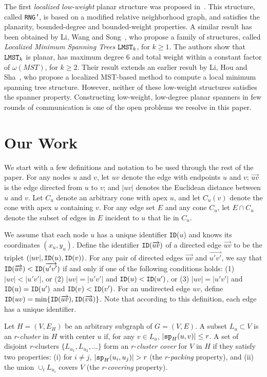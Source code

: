 \documentclass{llncs}
\newcommand{\id}{{\tt ID}}
\newcommand{\ssp}{{\tt sp}}
\newcommand{\N}{L}  \newcommand{\C}{C}
\newcommand{\lmst}{{\tt LMST}}
\newcommand{\w}{\omega}
\begin{document}
The first \emph{localized low-weight} planar structure was proposed
in~\cite{li-localmst-03}. This structure, called {\tt RNG'},
is based on a modified relative neighborhood graph, and satisfies the planarity,
bounded-degree and bounded-weight properties.
A similar result has been obtained by Li, Wang and Song~\cite{lws-ieee-04},
who propose a family of structures, called \emph{Localized Minimum Spanning Trees}
$\lmst_k$, for $k \ge 1$. The authors show that $\lmst_k$ is planar, has
maximum degree 6 and total weight within a constant factor of $\w(MST)$,
for $k \ge 2$. Their result extends an earlier result by Li, Hou and
Sha~\cite{lhs-infocom-03}, who propose a localized MST-based method to
compute a local minimum spanning tree structure.
However, neither of these low-weight structures satisfies the spanner property.
Constructing low-weight, low-degree planar spanners in few rounds of
communication is one of the open problems we resolve in this paper.

\section{Our Work}
We start with a few definitions and notation to be used through
the rest of the paper. For any nodes $u$ and $v$, let $uv$ denote the
edge with endpoints $u$ and $v$;
$\overrightarrow{uv}$ is the edge directed from $u$ to $v$; and
$|uv|$ denotes the Euclidean distance between $u$ and $v$.
Let $\C_u$ denote an arbitrary cone with
apex $u$, and let $\C_u(v)$ denote the cone with apex $u$ containing $v$.
For any edge set $E$ and any cone $\C_u$, let $E \cap \C_u$ denote the
subset of edges in $E$ incident to $u$ that lie in $\C_u$.

We assume that each node $u$ has a unique identifier \id($u$) and knows
its coordinates $(x_u, y_u)$.
Define the identifier $\id(\overrightarrow{uv})$ of a directed edge
$\overrightarrow{uv}$ to be the triplet $(|uv|, \id(u), \id(v))$.
For any pair of directed edges $\overrightarrow{uv}$ and
$\overrightarrow{u'v'}$, we say that $\id(\overrightarrow{uv}) <
\id(\overrightarrow{u'v'})$ if and only if one of the following
conditions holds: (1) $|uv| < |u'v'|$, or (2)
$|uv| = |u'v'|$ and $\id(u) < \id(u')$, or (3)
$|uv| = |u'v'|$ and $\id(u) = \id(u')$ and $\id(v) < \id(v')$.
For an undirected edge $uv$, define $\id(uv) =
\min\{\id(\overrightarrow{uv}), \id(\overrightarrow{vu})\}$. Note that according
to this definition, each edge has a unique identifier.

Let $H = (V, E_H)$ be an arbitrary subgraph of $G = (V, E)$. A subset
$\N_u \subset V$ is an $r$-\emph{cluster} in $H$ with center $u$ if, for
any $v \in \N_u$, $|\ssp_H(u, v)| \le r$. A set of disjoint
$r$-clusters $\{\N_{u_1}, \N_{u_2}, \ldots\}$ form an $r$-\emph{cluster cover} for
$V$ in $H$ if they satisfy two properties: (i) for $i \neq j$, $|\ssp_H(u_i,
u_j)| > r$ (the $r$-\emph{packing} property), and (ii) the union
$\cup_{i}\N_{u_i}$ covers $V$ (the $r$-\emph{covering} property).
\end{document}
